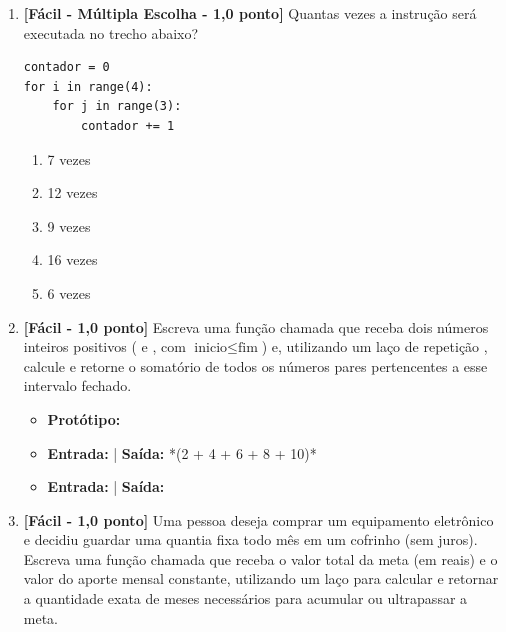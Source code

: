 \begin{enumerate}[label=\textbf{Q\arabic*.}, start=25]


\vspace{0.4cm}

\item \textbf{[Fácil - Múltipla Escolha - 1,0 ponto]} Quantas vezes a instrução  será executada no trecho abaixo?
\begin{verbatim}
contador = 0
for i in range(4):
    for j in range(3):
        contador += 1
\end{verbatim}

\begin{enumerate}[label=\textbf{(\Alph*)}]
    \item 7 vezes
    \item 12 vezes
    \item 9 vezes
    \item 16 vezes
    \item 6 vezes
\end{enumerate}



\vspace{0.4cm}

\item \textbf{[Fácil - 1,0 ponto]} Escreva uma função chamada  que receba dois números inteiros positivos ( e , com $\text{inicio} \le \text{fim}$) e, utilizando um laço de repetição , calcule e retorne o somatório de todos os números pares pertencentes a esse intervalo fechado.

\begin{itemize}[leftmargin=*]
    \item \textbf{Protótipo:}\newline {}
    \item \textbf{Entrada:}  | \textbf{Saída:}  *(2 + 4 + 6 + 8 + 10)*
    \item \textbf{Entrada:}  | \textbf{Saída:} 
\end{itemize}



\vspace{0.4cm}

\item \textbf{[Fácil - 1,0 ponto]} Uma pessoa deseja comprar um equipamento eletrônico e decidiu guardar uma quantia fixa todo mês em um cofrinho (sem juros). Escreva uma função chamada  que receba o valor total da meta (em reais) e o valor do aporte mensal constante, utilizando um laço  para calcular e retornar a quantidade exata de meses necessários para acumular ou ultrapassar a meta.


\end{enumerate}
